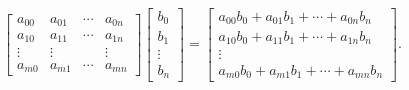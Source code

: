 \documentclass[letterpaper, 10 pt, conference]{ieeeconf}
\begin{document}
\begin{equation*}
\begin{bmatrix} 
a_{00} &a_{01} & \cdots & a_{0n}\\ a_{10} & a_{11} & \cdots & a_{1n}\\ \vdots & \vdots & & \vdots\\ a_{m0} & a_{m1} & \cdots & a_{mn}\end{bmatrix} \begin{bmatrix}b_{0}\\ b_{1}\\ \vdots\\ b_{n}\end{bmatrix}=\begin{bmatrix} a_{00}b_{0}+a_{01}b_{1}+ \cdots +a_{0n}b_{n}\\ a_{10}b_{0}+a_{11}b_{1}+ \cdots +a_{1n}b_{n}\\ \vdots\\ a_{m0}b_{0}+a_{m1}b_{1}+\cdots+a_{mn}b_{n}
\end{bmatrix}. 
\end{equation*}
\end{document}
